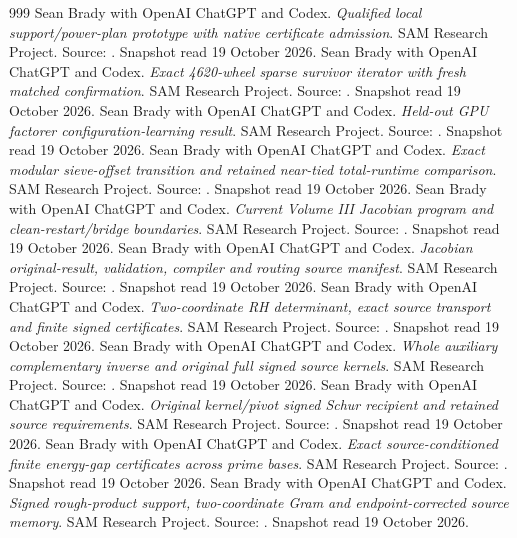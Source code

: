 \begin{thebibliography}{999}
 Sean Brady with OpenAI ChatGPT and Codex. \emph{Qualified local support/power-plan prototype with native certificate admission}. SAM Research Project. Source: . Snapshot read 19 October 2026.
 Sean Brady with OpenAI ChatGPT and Codex. \emph{Exact 4620-wheel sparse survivor iterator with fresh matched confirmation}. SAM Research Project. Source: . Snapshot read 19 October 2026.
 Sean Brady with OpenAI ChatGPT and Codex. \emph{Held-out GPU factorer configuration-learning result}. SAM Research Project. Source: . Snapshot read 19 October 2026.
 Sean Brady with OpenAI ChatGPT and Codex. \emph{Exact modular sieve-offset transition and retained near-tied total-runtime comparison}. SAM Research Project. Source: . Snapshot read 19 October 2026.
 Sean Brady with OpenAI ChatGPT and Codex. \emph{Current Volume III Jacobian program and clean-restart/bridge boundaries}. SAM Research Project. Source: . Snapshot read 19 October 2026.
 Sean Brady with OpenAI ChatGPT and Codex. \emph{Jacobian original-result, validation, compiler and routing source manifest}. SAM Research Project. Source: . Snapshot read 19 October 2026.
 Sean Brady with OpenAI ChatGPT and Codex. \emph{Two-coordinate RH determinant, exact source transport and finite signed certificates}. SAM Research Project. Source: . Snapshot read 19 October 2026.
 Sean Brady with OpenAI ChatGPT and Codex. \emph{Whole auxiliary complementary inverse and original full signed source kernels}. SAM Research Project. Source: . Snapshot read 19 October 2026.
 Sean Brady with OpenAI ChatGPT and Codex. \emph{Original kernel/pivot signed Schur recipient and retained source requirements}. SAM Research Project. Source: . Snapshot read 19 October 2026.
 Sean Brady with OpenAI ChatGPT and Codex. \emph{Exact source-conditioned finite energy-gap certificates across prime bases}. SAM Research Project. Source: . Snapshot read 19 October 2026.
 Sean Brady with OpenAI ChatGPT and Codex. \emph{Signed rough-product support, two-coordinate Gram and endpoint-corrected source memory}. SAM Research Project. Source: . Snapshot read 19 October 2026.

\end{thebibliography}
